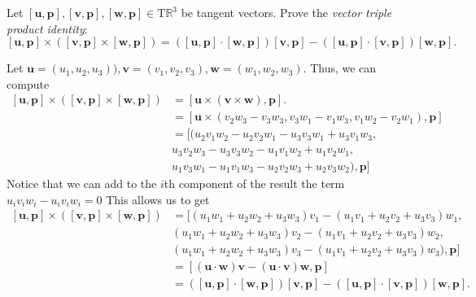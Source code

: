 \documentclass[12 pt, letterpaper]{hmcpset}
\begin{document}
\begin{problem}[Problem 1.]
	Let $[\mathbf{u}, \mathbf{p}], [\mathbf{v}, \mathbf{p}], [\mathbf{w}, \mathbf{p}] \in \mathrm{T}\mathbb{R}^{3}$ be tangent vectors. Prove the \textit{vector triple product identity}:
	\[
		[\mathbf{u}, \mathbf{p}] \times \left ( [\mathbf{v}, \mathbf{p}] \times [\mathbf{w}, \mathbf{p}] \right ) = \left ( [\mathbf{u}, \mathbf{p}] \cdot [\mathbf{w}, \mathbf{p}] \right ) [\mathbf{v}, \mathbf{p}] - \left ( [\mathbf{u}, \mathbf{p}] \cdot [\mathbf{v}, \mathbf{p}] \right ) [\mathbf{w}, \mathbf{p}].
	\]
\end{problem}

\begin{solution}
	Let $\mathbf{u} = (u_{1}, u_{2}, u_{3})), \mathbf{v} = (v_{1}, v_{2}, v_{3}), \mathbf{w} = (w_{1}, w_{2}, w_{3})$. Thus, we can compute
	\[
		\begin{split}
			[\mathbf{u}, \mathbf{p}] \times ([\mathbf{v}, \mathbf{p}] \times [\mathbf{w}, \mathbf{p}]) & = [\mathbf{u} \times (\mathbf{v} \times \mathbf{w}), \mathbf{p}]. \\
														   & = [\mathbf{u} \times (v_{2} w_{3} - v_{3} w_{3}, v_{3} w_{1} - v_{1} w_{3}, v_{1} w_{2} - v_{2} w_{1}), \mathbf{p}] \\
														   & = [(u_{2} v_{1} w_{2} - u_{2} v_{2} w_{1} - u_{3} v_{3} w_{1} + u_{3} v_{1} w_{3}, \\
														   & u_{3} v_{2} w_{3} - u_{3} v_{3} w_{2} - u_{1} v_{1} w_{2} + u_{1} v_{2} w_{1}, \\
														   & u_{1} v_{3} w_{1} - u_{1} v_{1} w_{3} - u_{2} v_{2} w_{3} + u_{2} v_{3} w_{2}), \mathbf{p}]
		\end{split}
	\]
	Notice that we can add to the $i$th component of the result the term $u_{i} v_{i} w_{i} - u_{i} v_{i} w_{i} = 0$  This allows us to get
	\[
		\begin{split}
			[\mathbf{u}, \mathbf{p}] \times ([\mathbf{v}, \mathbf{p}] \times [\mathbf{w}, \mathbf{p}]) & = [(u_{1} w_{1} + u_{2} w_{2} + u_{3} w_{3}) v_{1} - (u_{1} v_{1} + u_{2} v_{2} + u_{3} v_{3}) w_{1}, \\
														   & (u_{1} w_{1} + u_{2} w_{2} + u_{3} w_{3}) v_{2} - (u_{1} v_{1} + u_{2} v_{2} + u_{3} v_{3}) w_{2}, \\
														   & (u_{1} w_{1} + u_{2} w_{2} + u_{3} w_{3}) v_{3} - (u_{1} v_{1} + u_{2} v_{2} + u_{3} v_{3}) w_{3}), \mathbf{p}] \\
														   & = [(\mathbf{u} \cdot \mathbf{w}) \mathbf{v} - (\mathbf{u} \cdot \mathbf{v}) \mathbf{w}, \mathbf{p}] \\
														   & = \left ( [\mathbf{u}, \mathbf{p}] \cdot [\mathbf{w}, \mathbf{p}] \right ) [\mathbf{v}, \mathbf{p}] - \left ( [\mathbf{u}, \mathbf{p}] \cdot [\mathbf{v}, \mathbf{p}] \right ) [\mathbf{w}, \mathbf{p}].
		\end{split}
	\]
\end{solution}
\end{document}
